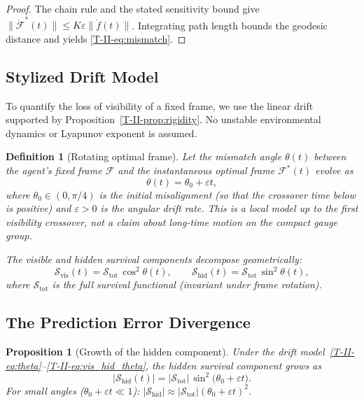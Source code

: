 \documentclass[12pt,a4paper,openany]{book}
\newtheorem{proposition}[theorem]{Proposition}
\newtheorem{definition}[theorem]{Definition}
\begin{document}
\begin{proof}
The chain rule and the stated sensitivity bound give
$\lVert\dot{\mathcal F}^*(t)\rVert
\leq K\varepsilon\lVert\dot f(t)\rVert$.
Integrating path length bounds the geodesic distance and yields
\eqref{T-II-eq:mismatch}.
\end{proof}

\subsection{Stylized Drift Model}
\label{T-II-subsec:drift_model}

To quantify the loss of visibility of a fixed frame, we use the linear
drift supported by Proposition~\ref{T-II-prop:rigidity}.  No unstable
environmental dynamics or Lyapunov exponent is assumed.

\begin{definition}[Rotating optimal frame]
\label{T-II-def:drift}
Let the mismatch angle $\theta(t)$ between the agent's
fixed frame $\mathcal{F}$ and the instantaneous optimal
frame $\mathcal{F}^*(t)$ evolve as
\begin{equation}
\label{T-II-eq:theta}
\theta(t) = \theta_0+\varepsilon t,
\end{equation}
where $\theta_0 \in (0, \pi/4)$ is the initial misalignment
(so that the crossover time below is positive) and
$\varepsilon>0$ is the angular drift rate.  This is a local model up to
the first visibility crossover, not a claim about long-time motion on
the compact gauge group.

The visible and hidden survival components decompose
geometrically:
\begin{equation}
\label{T-II-eq:vis_hid_theta}
\mathcal{S}_{\mathrm{vis}}(t)
= \mathcal{S}_{\mathrm{tot}}\,\cos^2\theta(t),
\qquad
\mathcal{S}_{\mathrm{hid}}(t)
= \mathcal{S}_{\mathrm{tot}}\,\sin^2\theta(t),
\end{equation}
where $\mathcal{S}_{\mathrm{tot}}$ is the full survival
functional (invariant under frame rotation).
\end{definition}

\subsection{The Prediction Error Divergence}
\label{T-II-subsec:divergence}

\begin{proposition}[Growth of the hidden component]
\label{T-II-prop:divergence}
Under the drift model~\eqref{T-II-eq:theta}--\eqref{T-II-eq:vis_hid_theta},
the hidden survival component grows as
\begin{equation}
\label{T-II-eq:divergence}
\bigl|\mathcal{S}_{\mathrm{hid}}(t)\bigr|
= |\mathcal{S}_{\mathrm{tot}}|\,\sin^2\!\bigl(\theta_0+
  \varepsilon t\bigr).
\end{equation}
For small angles ($\theta_0+\varepsilon t \ll 1$):
$|\mathcal{S}_{\mathrm{hid}}| \approx
|\mathcal{S}_{\mathrm{tot}}|(\theta_0+\varepsilon t)^2$.
\end{proposition}
\end{document}
